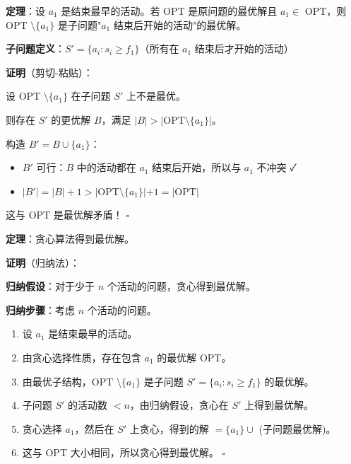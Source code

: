 \documentclass[12pt, a4paper]{ctexart}
\begin{document}
\begin{blackboard}[定理：最优子结构]

\textbf{定理}：设 $a_1$ 是结束最早的活动。若 OPT 是原问题的最优解且 $a_1 \in$ OPT，则 OPT $\setminus \{a_1\}$ 是子问题"$a_1$ 结束后开始的活动"的最优解。

\textbf{子问题定义}：$S' = \{a_i : s_i \geq f_1\}$（所有在 $a_1$ 结束后才开始的活动）

\textbf{证明}（剪切-粘贴）：

设 OPT $\setminus \{a_1\}$ 在子问题 $S'$ 上不是最优。

则存在 $S'$ 的更优解 $B$，满足 $|B| > |$OPT$ \setminus \{a_1\}|$。

构造 $B' = B \cup \{a_1\}$：

\begin{itemize}
    \item $B'$ 可行：$B$ 中的活动都在 $a_1$ 结束后开始，所以与 $a_1$ 不冲突 ✓
    \item $|B'| = |B| + 1 > |$OPT$ \setminus \{a_1\}| + 1 = |$OPT$|$
\end{itemize}

这与 OPT 是最优解矛盾！ $\square$

\end{blackboard}

\begin{blackboard}[完整的归纳证明]

\textbf{定理}：贪心算法得到最优解。

\textbf{证明}（归纳法）：

\textbf{归纳假设}：对于少于 $n$ 个活动的问题，贪心得到最优解。

\textbf{归纳步骤}：考虑 $n$ 个活动的问题。

\begin{enumerate}
    \item 设 $a_1$ 是结束最早的活动。
    \item 由贪心选择性质，存在包含 $a_1$ 的最优解 OPT。
    \item 由最优子结构，OPT $\setminus \{a_1\}$ 是子问题 $S' = \{a_i : s_i \geq f_1\}$ 的最优解。
    \item 子问题 $S'$ 的活动数 $< n$，由归纳假设，贪心在 $S'$ 上得到最优解。
    \item 贪心选择 $a_1$，然后在 $S'$ 上贪心，得到的解 $= \{a_1\} \cup$ (子问题最优解)。
    \item 这与 OPT 大小相同，所以贪心得到最优解。 $\square$
\end{enumerate}

\end{blackboard}
\end{document}
